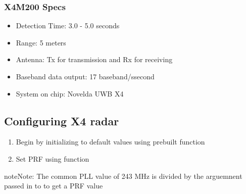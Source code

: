 \documentclass[letterpaper,10pt,english]{sphinxmanual}
\begin{document}
\subsubsection{X4M200 Specs}
\label{\detokenize{radar information:x4m200-specs}}\begin{itemize}
\item {} 
Detection Time: 3.0  - 5.0 seconds

\item {} 
Range: 5 meters

\item {} 
Antenna: Tx for transmission and Rx for receiving

\item {} 
Baseband data output: 17 baseband/ssecond

\item {} 
System on chip: Novelda UWB X4

\end{itemize}


\subsection{Configuring X4 radar}
\label{\detokenize{radar information:configuring-x4-radar}}\begin{enumerate}
\def\theenumi{\arabic{enumi}}
\def\labelenumi{\theenumi .}
\makeatletter\def\p@enumii{\p@enumi \theenumi .}\makeatother
\item {} 
Begin by initializing to default values using prebuilt function 

\item {} 
Set PRF using function 

\end{enumerate}

\begin{sphinxadmonition}{note}{Note:}
The common PLL value of 243 MHz is divided by the arguemnent passed in to  to get a PRF value
\end{sphinxadmonition}
\end{document}
